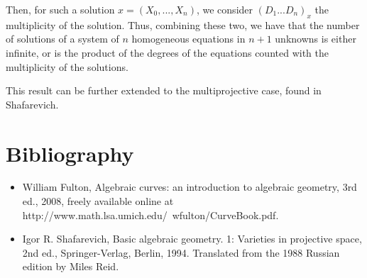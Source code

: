 \documentclass[10pt]{article}
\begin{document}
Then, for such a solution $x = (X_0,...,X_n)$, we consider $(D_1...D_n)_x$ the multiplicity of the solution. Thus, combining these two, we have that the number of solutions of a system of $n$ homogeneous equations in $n+1$ unknowns is either infinite, or is the product of the degrees of the equations counted with the multiplicity of the solutions.

This result can be further extended to the multiprojective case, found in Shafarevich.

\section{Bibliography}

\begin{itemize}

\item[] William Fulton, Algebraic curves: an introduction to algebraic geometry, 3rd ed., 2008, freely available online at http://www.math.lsa.umich.edu/~wfulton/CurveBook.pdf.\\
\item[] Igor R. Shafarevich, Basic algebraic geometry. 1: Varieties in projective space, 2nd ed., Springer-Verlag, Berlin, 1994. Translated from the 1988 Russian edition by Miles Reid.

\end{itemize}
\end{document}
